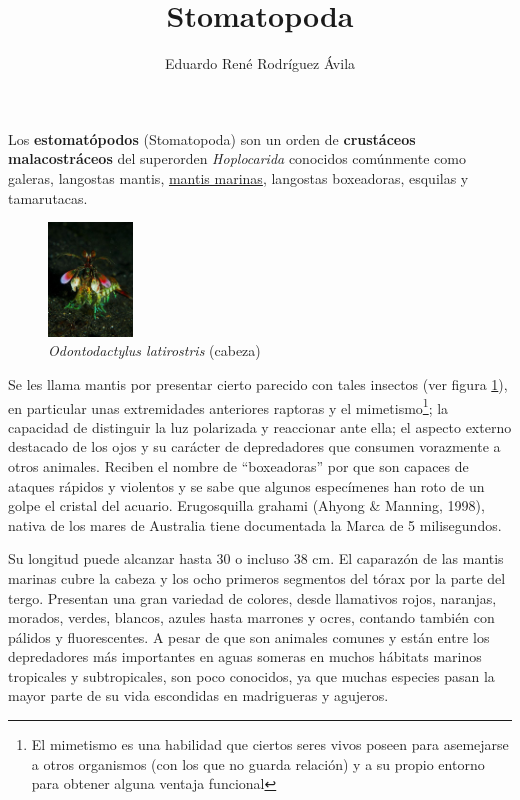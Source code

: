\documentclass[10pt,twocolumn]{article}
\title{Stomatopoda}
\author{Eduardo René Rodríguez Ávila}
\begin{document}
\maketitle

Los \textbf{estomatópodos} (Stomatopoda) son un or\-den de \textbf{crustáceos malacostráceos} del superorden \textit{Hoplocarida}\cite{martin_updated_2001} conocidos comúnmente como galeras, langostas mantis, \underline{mantis marinas}, langostas boxeadoras, esquilas y tamarutacas.

\begin{figure}[h] 
	\centering
	\includegraphics[width=0.2\textwidth]{img/stomatopoda.jpg}
	\caption{\textit{Odontodactylus latirostris} (cabeza)}
	\label{fig:uno}
\end{figure}

Se les llama mantis por presentar cierto parecido con tales insectos (ver figura \ref{fig:uno}), en particular unas extremidades anteriores raptoras y el mimetismo\footnote{El mimetismo es una habilidad que ciertos seres vivos poseen para asemejarse a otros organismos (con los que no guarda relación) y a su propio entorno para obtener alguna ventaja funcional}; la capacidad de distinguir la luz polarizada y reaccionar ante ella; el aspecto externo destacado de los ojos y su carácter de depredadores que consumen vorazmente a otros animales. Reciben el nombre de ``boxeadoras'' por que son capaces de ataques rápidos y violentos y se sabe que algunos especímenes han roto de un golpe el cristal del acuario.\cite{holladay_shrimp_2006} Erugosquilla grahami (Ahyong \& Manning, 1998), nativa de los mares de Australia tiene documentada la Marca de 5 mi\-li\-se\-gun\-dos.



Su longitud puede alcanzar hasta 30 o incluso 38 cm\cite{gonser_large_2007}. El caparazón de las mantis marinas cubre la cabeza y los ocho primeros segmentos del tórax por la parte del tergo. Presentan una gran variedad de colores, desde llamativos rojos, naranjas, morados, verdes, blancos, azules hasta marrones y ocres, contando también con pálidos y fluorescentes. A pesar de que son animales comunes y están entre los depredadores más importantes en aguas someras en muchos hábitats marinos tropicales y subtropicales, son poco co\-no\-ci\-dos, ya que muchas especies pasan la mayor parte de su vida escondidas en madrigueras y agujeros.\cite{piper_extraordinary_2007}
\end{document}
